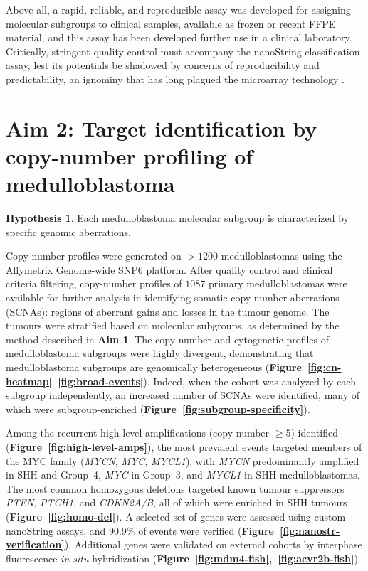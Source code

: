 \documentclass[11pt,letterpaper]{article}
\theoremstyle{definition}
\newtheorem*{hypothesis}{Hypothesis}
\begin{document}
Above all, a rapid, reliable, and reproducible assay was developed for assigning molecular subgroups to clinical samples, available as frozen or recent FFPE material, and this assay has been developed further use in a clinical laboratory. Critically, stringent quality control must accompany the nanoString classification assay, lest its potentials be shadowed by concerns of reproducibility and predictability, an ignominy that has long plagued the microarray technology .


\section{Aim 2: Target identification by copy-number profiling of medulloblastoma}

\begin{hypothesis}
Each medulloblastoma molecular subgroup is characterized by specific genomic aberrations.
\end{hypothesis}

Copy-number profiles were generated on $> 1200$ medulloblastomas using the Affymetrix Genome-wide SNP6 platform. After quality control and clinical criteria filtering, copy-number profiles of $1087$ primary medulloblastomas were available for further analysis in identifying somatic copy-number aberrations (SCNAs): regions of aberrant gains and losses in the tumour genome. The tumours were stratified based on molecular subgroups, as determined by the method described in \textbf{Aim 1}. The copy-number and cytogenetic profiles of medulloblastoma subgroups were highly divergent, demonstrating that medulloblastoma subgroups are genomically heterogeneous (\textbf{Figure~\ref{fig:cn-heatmap}--\ref{fig:broad-events}}). Indeed, when the cohort was analyzed by each subgroup independently, an increased number of SCNAs were identified, many of which were subgroup-enriched (\textbf{Figure~\ref{fig:subgroup-specificity}}).

Among the recurrent high-level amplifications (copy-number $\geq 5$) identified (\textbf{Figure~\ref{fig:high-level-amps}}), the most prevalent events targeted members of the MYC family (\emph{MYCN}, \emph{MYC}, \emph{MYCL1}), with \emph{MYCN} predominantly amplified in SHH and Group~4, \emph{MYC} in Group~3, and \emph{MYCL1} in SHH medulloblastomas.
The most common homozygous deletions targeted known tumour suppressors \emph{PTEN}, \emph{PTCH1}, and \emph{CDKN2A/B}, all of which were enriched in SHH tumours (\textbf{Figure~\ref{fig:homo-del}}). A selected set of genes were assessed using custom nanoString assays, and 90.9\% of events were verified (\textbf{Figure~\ref{fig:nanostr-verification}}). Additional genes were validated on external cohorts by interphase fluorescence \emph{in situ} hybridization (\textbf{Figure~\ref{fig:mdm4-fish},~\ref{fig:acvr2b-fish}}).
\end{document}
